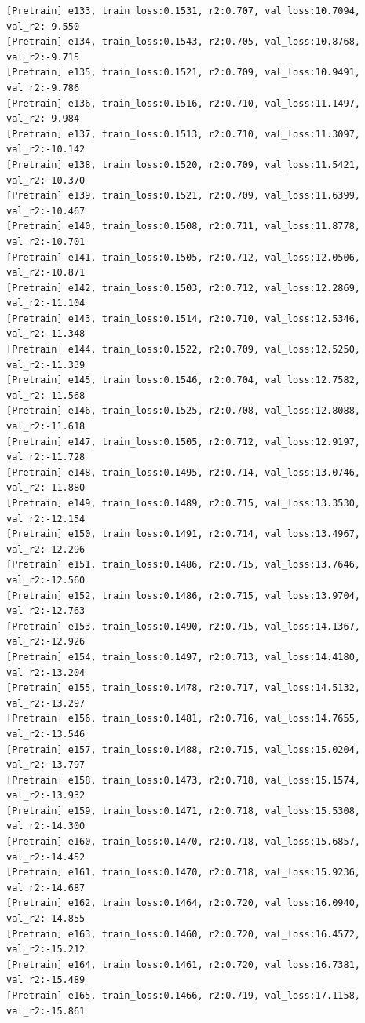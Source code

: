\documentclass[a4paper, 12pt]{article}
\begin{document}
\begin{lstlisting}
[Pretrain] e133, train_loss:0.1531, r2:0.707, val_loss:10.7094, val_r2:-9.550
[Pretrain] e134, train_loss:0.1543, r2:0.705, val_loss:10.8768, val_r2:-9.715
[Pretrain] e135, train_loss:0.1521, r2:0.709, val_loss:10.9491, val_r2:-9.786
[Pretrain] e136, train_loss:0.1516, r2:0.710, val_loss:11.1497, val_r2:-9.984
[Pretrain] e137, train_loss:0.1513, r2:0.710, val_loss:11.3097, val_r2:-10.142
[Pretrain] e138, train_loss:0.1520, r2:0.709, val_loss:11.5421, val_r2:-10.370
[Pretrain] e139, train_loss:0.1521, r2:0.709, val_loss:11.6399, val_r2:-10.467
[Pretrain] e140, train_loss:0.1508, r2:0.711, val_loss:11.8778, val_r2:-10.701
[Pretrain] e141, train_loss:0.1505, r2:0.712, val_loss:12.0506, val_r2:-10.871
[Pretrain] e142, train_loss:0.1503, r2:0.712, val_loss:12.2869, val_r2:-11.104
[Pretrain] e143, train_loss:0.1514, r2:0.710, val_loss:12.5346, val_r2:-11.348
[Pretrain] e144, train_loss:0.1522, r2:0.709, val_loss:12.5250, val_r2:-11.339
[Pretrain] e145, train_loss:0.1546, r2:0.704, val_loss:12.7582, val_r2:-11.568
[Pretrain] e146, train_loss:0.1525, r2:0.708, val_loss:12.8088, val_r2:-11.618
[Pretrain] e147, train_loss:0.1505, r2:0.712, val_loss:12.9197, val_r2:-11.728
[Pretrain] e148, train_loss:0.1495, r2:0.714, val_loss:13.0746, val_r2:-11.880
[Pretrain] e149, train_loss:0.1489, r2:0.715, val_loss:13.3530, val_r2:-12.154
[Pretrain] e150, train_loss:0.1491, r2:0.714, val_loss:13.4967, val_r2:-12.296
[Pretrain] e151, train_loss:0.1486, r2:0.715, val_loss:13.7646, val_r2:-12.560
[Pretrain] e152, train_loss:0.1486, r2:0.715, val_loss:13.9704, val_r2:-12.763
[Pretrain] e153, train_loss:0.1490, r2:0.715, val_loss:14.1367, val_r2:-12.926
[Pretrain] e154, train_loss:0.1497, r2:0.713, val_loss:14.4180, val_r2:-13.204
[Pretrain] e155, train_loss:0.1478, r2:0.717, val_loss:14.5132, val_r2:-13.297
[Pretrain] e156, train_loss:0.1481, r2:0.716, val_loss:14.7655, val_r2:-13.546
[Pretrain] e157, train_loss:0.1488, r2:0.715, val_loss:15.0204, val_r2:-13.797
[Pretrain] e158, train_loss:0.1473, r2:0.718, val_loss:15.1574, val_r2:-13.932
[Pretrain] e159, train_loss:0.1471, r2:0.718, val_loss:15.5308, val_r2:-14.300
[Pretrain] e160, train_loss:0.1470, r2:0.718, val_loss:15.6857, val_r2:-14.452
[Pretrain] e161, train_loss:0.1470, r2:0.718, val_loss:15.9236, val_r2:-14.687
[Pretrain] e162, train_loss:0.1464, r2:0.720, val_loss:16.0940, val_r2:-14.855
[Pretrain] e163, train_loss:0.1460, r2:0.720, val_loss:16.4572, val_r2:-15.212
[Pretrain] e164, train_loss:0.1461, r2:0.720, val_loss:16.7381, val_r2:-15.489
[Pretrain] e165, train_loss:0.1466, r2:0.719, val_loss:17.1158, val_r2:-15.861

\end{lstlisting}
\end{document}
